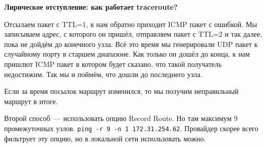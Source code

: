 {\bf Лирическое отступление: как работает traceroute?}

Отсылаем пакет с TTL=1, к нам обратно приходит ICMP пакет с ошибкой. Мы записываем адрес, с которого он пришёл, отправляем пакет с TTL=2 и так далее, пока не дойдём до конечного узла. Всё это время мы генерировали UDP пакет к случайному порту в старшем диапазоне. Как только он дошёл до конца, к нам пришлют ICMP пакет в котором будет сказано, что такой получатель недостижим. Так мы и поймём, что дошли до последнего узла.

Если за время посылок маршрут изменился, то мы получим неправильный маршрут в итоге.

Второй способ~--- использовать опцию Record Route. Но там максимум 9 промежуточных узлов. {\tt ping -r 9 -n 1 172.31.254.62}. Провайдер скорее всего фильтрует эту опцию, но в локальной сети использовать можно.

